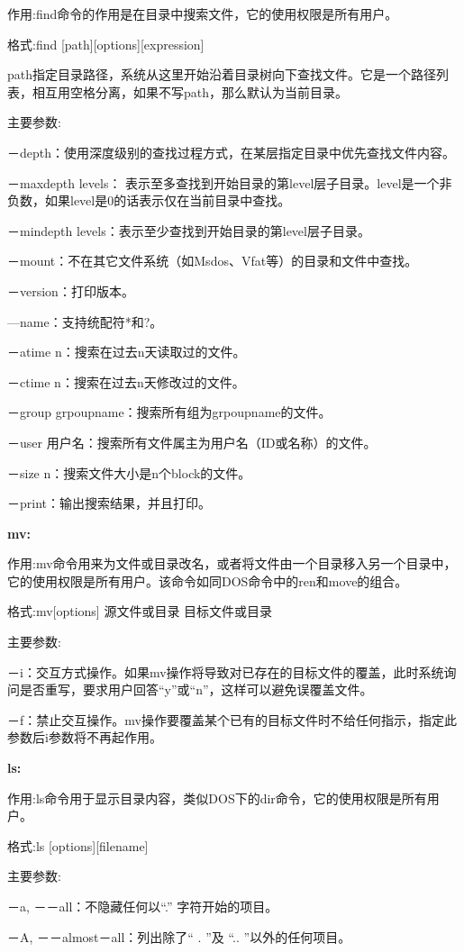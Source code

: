 作用:find命令的作用是在目录中搜索文件，它的使用权限是所有用户。

格式:find [path][options][expression]

path指定目录路径，系统从这里开始沿着目录树向下查找文件。它是一个路径列表，相互用空格分离，如果不写path，那么默认为当前目录。

主要参数:

－depth：使用深度级别的查找过程方式，在某层指定目录中优先查找文件内容。

－maxdepth levels：
表示至多查找到开始目录的第level层子目录。level是一个非负数，如果level是0的话表示仅在当前目录中查找。

－mindepth levels：表示至少查找到开始目录的第level层子目录。

－mount：不在其它文件系统（如Msdos、Vfat等）的目录和文件中查找。

－version：打印版本。

—name：支持统配符*和?。

－atime n：搜索在过去n天读取过的文件。

－ctime n：搜索在过去n天修改过的文件。

－group grpoupname：搜索所有组为grpoupname的文件。

－user 用户名：搜索所有文件属主为用户名（ID或名称）的文件。

－size n：搜索文件大小是n个block的文件。

－print：输出搜索结果，并且打印。

\textbf{mv:}

作用:mv命令用来为文件或目录改名，或者将文件由一个目录移入另一个目录中，它的使用权限是所有用户。该命令如同DOS命令中的ren和move的组合。

格式:mv[options] 源文件或目录 目标文件或目录

主要参数:

－i：交互方式操作。如果mv操作将导致对已存在的目标文件的覆盖，此时系统询问是否重写，要求用户回答“y”或“n”，这样可以避免误覆盖文件。

－f：禁止交互操作。mv操作要覆盖某个已有的目标文件时不给任何指示，指定此参数后i参数将不再起作用。

\textbf{ls:}

作用:ls命令用于显示目录内容，类似DOS下的dir命令，它的使用权限是所有用户。

格式:ls [options][filename]

主要参数:

－a, －－all：不隐藏任何以“.” 字符开始的项目。

－A, －－almost－all：列出除了“ . ”及 “.. ”以外的任何项目。

